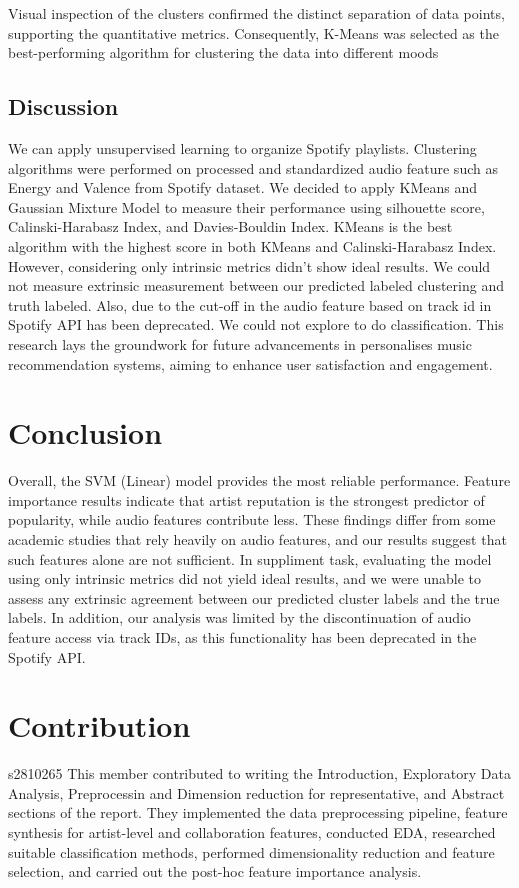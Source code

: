 \documentclass{article}
\begin{document}
{{{{{{{Visual inspection of the clusters confirmed the distinct separation of data points, supporting the quantitative metrics. Consequently, K-Means was selected as the best-performing algorithm for clustering the data into different moods


\subsection{Discussion}
We can apply unsupervised learning to organize Spotify playlists. Clustering algorithms were performed on processed and standardized audio feature such as Energy and Valence from Spotify dataset. We decided to apply KMeans and Gaussian Mixture Model to measure their performance using silhouette score, Calinski-Harabasz Index, and Davies-Bouldin Index. KMeans is the best algorithm with the highest score in both KMeans and Calinski-Harabasz Index. However, considering only intrinsic metrics didn't show ideal results. We could not measure extrinsic measurement between our predicted labeled clustering and truth labeled. Also, due to the cut-off in the audio feature based on track id in Spotify API has been deprecated. We could not explore to do classification. This research lays the groundwork for future advancements in personalises music recommendation systems, aiming to enhance user satisfaction and engagement. 

\section{Conclusion}
Overall, the SVM (Linear) model provides the most reliable performance. Feature importance results indicate that artist reputation is the strongest predictor of popularity, while audio features contribute less. These findings differ from some academic studies that rely heavily on audio features, and our results suggest that such features alone are not sufficient. 
In suppliment task, evaluating the model using only intrinsic metrics did not yield ideal results, and we were unable to assess any extrinsic agreement between our predicted cluster labels and the true labels. In addition, our analysis was limited by the discontinuation of audio feature access via track IDs, as this functionality has been deprecated in the Spotify API.
\newpage




\newpage
\section*{Contribution}
s2810265
This member contributed to writing the Introduction, Exploratory Data Analysis, Preprocessin and Dimension reduction for representative, and Abstract sections of the report. They implemented the data preprocessing pipeline, feature synthesis for artist-level and collaboration features, conducted EDA, researched suitable classification methods, performed dimensionality reduction and feature selection, and carried out the post-hoc feature importance analysis.

}}}}}}}
\end{document}
